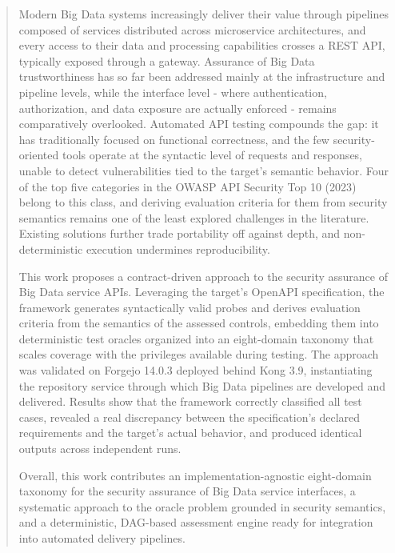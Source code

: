 \documentclass[
]{ceurart}
\begin{document}
\address[1]{SESAR Lab, Dipartimento di Informatica "Giovanni Degli Antoni", Università degli Studi di Milano, Via Celoria 18, Milano, 20133, Italia}


\begin{abstract}
  Modern Big Data systems increasingly deliver their value through pipelines composed of services distributed across microservice architectures, and every access to their data and processing capabilities crosses a REST API, typically exposed through a gateway.
  Assurance of Big Data trustworthiness has so far been addressed mainly at the infrastructure and pipeline levels, while the interface level - where authentication, authorization, and data exposure are actually enforced - remains comparatively overlooked.
  Automated API testing compounds the gap: it has traditionally focused on functional correctness, and the few security-oriented tools operate at the syntactic level of requests and responses, unable to detect vulnerabilities tied to the target's semantic behavior.
  Four of the top five categories in the OWASP API Security Top 10 (2023) belong to this class, and deriving evaluation criteria for them from security semantics remains one of the least explored challenges in the literature.
  Existing solutions further trade portability off against depth, and non-deterministic execution undermines reproducibility.

  This work proposes a contract-driven approach to the security assurance of Big Data service APIs.
  Leveraging the target's OpenAPI specification, the framework generates syntactically valid probes and derives evaluation criteria from the semantics of the assessed controls, embedding them into deterministic test oracles organized into an eight-domain taxonomy that scales coverage with the privileges available during testing.
  The approach was validated on Forgejo 14.0.3 deployed behind Kong 3.9, instantiating the repository service through which Big Data pipelines are developed and delivered. Results show that the framework correctly classified all test cases, revealed a real discrepancy between the specification's declared requirements and the target's actual behavior, and produced identical outputs across independent runs.

  Overall, this work contributes an implementation-agnostic eight-domain taxonomy for the security assurance of Big Data service interfaces, a systematic approach to the oracle problem grounded in security semantics, and a deterministic, DAG-based assessment engine ready for integration into automated delivery pipelines.
\end{abstract}
\end{document}
